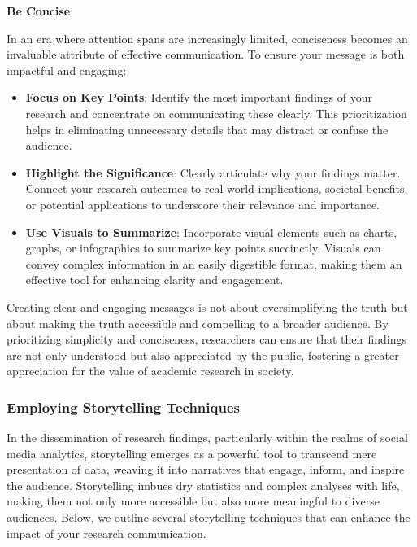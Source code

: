 \documentclass[
]{book}
\begin{document}
\textbf{Be Concise}

In an era where attention spans are increasingly limited, conciseness becomes an invaluable attribute of effective communication. To ensure your message is both impactful and engaging:

\begin{itemize}
\item
  \textbf{Focus on Key Points}: Identify the most important findings of your research and concentrate on communicating these clearly. This prioritization helps in eliminating unnecessary details that may distract or confuse the audience.
\item
  \textbf{Highlight the Significance}: Clearly articulate why your findings matter. Connect your research outcomes to real-world implications, societal benefits, or potential applications to underscore their relevance and importance.
\item
  \textbf{Use Visuals to Summarize}: Incorporate visual elements such as charts, graphs, or infographics to summarize key points succinctly. Visuals can convey complex information in an easily digestible format, making them an effective tool for enhancing clarity and engagement.
\end{itemize}

Creating clear and engaging messages is not about oversimplifying the truth but about making the truth accessible and compelling to a broader audience. By prioritizing simplicity and conciseness, researchers can ensure that their findings are not only understood but also appreciated by the public, fostering a greater appreciation for the value of academic research in society.

\hypertarget{employing-storytelling-techniques-1}{%
\subsubsection*{Employing Storytelling Techniques}\label{employing-storytelling-techniques-1}}

In the dissemination of research findings, particularly within the realms of social media analytics, storytelling emerges as a powerful tool to transcend mere presentation of data, weaving it into narratives that engage, inform, and inspire the audience. Storytelling imbues dry statistics and complex analyses with life, making them not only more accessible but also more meaningful to diverse audiences. Below, we outline several storytelling techniques that can enhance the impact of your research communication.
\end{document}
